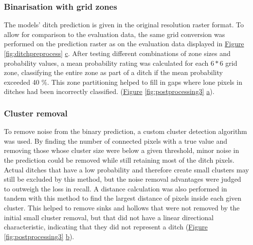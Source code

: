 \documentclass[11pt, review]{elsarticle} %
\begin{document}
\subsubsection{Binarisation with grid zones}
The models' ditch prediction is given in the original resolution raster format. To allow for comparison to the evaluation data, the same grid conversion was performed on the prediction raster as on the evaluation data displayed in \hyperref[fig:ditchpreprocess]{Figure} \ref{fig:ditchpreprocess} \hyperref[fig:ditchpreprocess]{c}. After testing different combinations of zone sizes and probability values, a mean probability rating was calculated for each $6*6$ grid zone, classifying the entire zone as part of a ditch if the mean probability exceeded 40 \%. This zone partitioning helped to fill in gaps where lone pixels in ditches had been incorrectly classified. (\hyperref[fig:postprocessing3]{Figure} \ref{fig:postprocessing3} \hyperref[fig:postprocessing3]{a}).

\subsubsection{Cluster removal}
To remove noise from the binary prediction, a custom cluster detection algorithm was used. By finding the number of connected pixels with a true value and removing those whose cluster size were below a given threshold, minor noise in the prediction could be removed while still retaining most of the ditch pixels. Actual ditches that have a low probability and therefore create small clusters may still be excluded by this method, but the noise removal advantages were judged to outweigh the loss in recall. A distance calculation was also performed in tandem with this method to find the largest distance of pixels inside each given cluster. This helped to remove sinks and hollows that were not removed by the initial small cluster removal, but that did not have a linear directional characteristic, indicating that they did not represent a ditch (\hyperref[fig:postprocessing3]{Figure} \ref{fig:postprocessing3} \hyperref[fig:postprocessing3]{b}).
\end{document}
